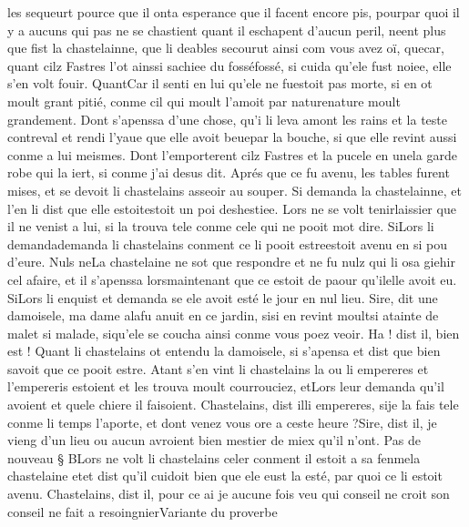 \documentclass{article}
\begin{document}
\begin{pages}
   les sequeurt pource que il onta esperance que il facent encore pis, 
   pourpar quoi il y a aucuns qui pas ne se chastient quant il eschapent 
   d’aucun peril, neent plus que fist la chastelainne, que li deables secourut 
   ainsi com vous avez oï, 
   quecar, quant cilz Fastres l’ot ainssi 
   sachiee du fosséfossé, si cuida qu’ele fust noiee, 
   elle s’en volt fouir. 
   QuantCar il senti en lui qu’ele ne 
   fuestoit pas morte, si en ot moult grant pitié, 
   conme cil qui moult l’amoit par naturenature moult grandement. 
   Dont s’apenssa d’une chose, qu’i li leva amont les rains et la teste contreval 
   et rendi l’yaue que elle avoit beuepar la bouche, si que elle revint 
   aussi conme a lui meismes. 
   Dont l’emporterent cilz Fastres et la pucele 
   en unela garde robe qui la iert, 
   si conme j’ai desus dit. \pend
            \pstart Aprés que ce fu avenu, les tables furent mises, et se devoit 
   li chastelains asseoir au souper. Si demanda la chastelainne, 
   et l’en li dist que elle estoitestoit un poi 
      deshestiee. Lors ne se volt 
   tenirlaissier que il ne venist a lui, 
   si la trouva tele conme cele qui ne pooit mot dire. SiLors li 
   demandademanda li chastelains 
   conment ce li pooit estreestoit avenu 
      en si pou d’eure. 
   Nuls neLa chastelaine ne sot que respondre et ne fu nulz qui li osa giehir 
   cel afaire, et il s’apenssa lorsmaintenant que 
   ce estoit de paour qu’ilelle avoit eu. 
   SiLors li enquist et demanda 
   se ele avoit esté le jour en nul lieu.
   Sire, dit une damoisele, ma dame 
      alafu anuit en ce jardin, 
      sisi en revint 
      moultsi atainte 
      de malet si malade, 
      siqu'ele se coucha ainsi conme vous poez veoir.
   Ha ! dist il, bien est !
      Quant li chastelains ot entendu la damoisele, si s'apensa et dist que bien savoit que ce pooit estre.
   Atant s’en vint li chastelains la ou li empereres 
   et l’empereris estoient et les trouva moult courrouciez, 
   etLors leur demanda 
   qu’il avoient et quele chiere il faisoient.
   Chastelains, dist illi empereres, 
      sije la fais tele conme li temps l’aporte, et dont venez vous ore a 
      ceste heure ?Sire, dist il, je vieng d’un lieu ou aucun avroient bien mestier de miex qu’il n’ont. \pend
\pstart Pas de nouveau § BLors ne volt 
   li chastelains celer conment il estoit a 
   sa fenmela chastelaine 
   etet dist qu’il cuidoit bien que ele eust la esté, par quoi ce li estoit 
   avenu.
   Chastelains, dist il, pour ce ai je aucune fois veu 
   qui conseil ne croit son conseil ne fait a resoingnierVariante du proverbe

\end{pages}
\end{document}
